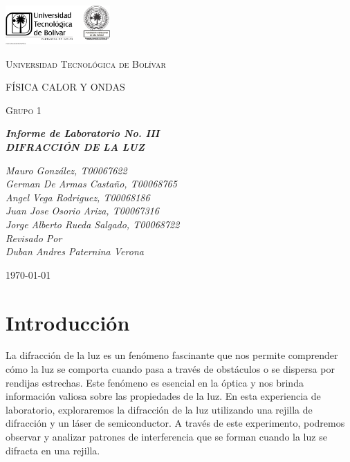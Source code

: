 \documentclass[twocolumn, 12pt]{article}
\begin{document}
\begin{titlepage}
      \centering
      \includegraphics[width=0.3\textwidth]{Images/logo_utb.png}\par\vspace{1cm}
      {\scshape\LARGE Universidad Tecnológica de Bolívar \par}
      \vspace{1cm}

      {\scshape\Large FÍSICA CALOR Y ONDAS \par}
      \vspace{.2cm}

      {\scshape\Large Grupo 1 \par}
      \vspace{1cm}
      \slshape {\Large \bfseries{}Informe de Laboratorio No. III\\}
      \slshape {\small \bfseries{}DIFRACCIÓN DE LA LUZ}
      \vspace{2cm}

      \slshape {\itshape{} Mauro González, T00067622 \\}
      \slshape {\itshape{} German De Armas Castaño, T00068765 \\}
      \slshape {\itshape{} Angel Vega Rodriguez, T00068186 \\}
      \slshape {\itshape{} Juan Jose Osorio Ariza, T00067316 \\}
      \slshape {\itshape{} Jorge Alberto Rueda Salgado, T00068722 \\}
      \vfill
      Revisado Por \\
      Duban Andres Paternina Verona\\
      {\large \today\par}
\end{titlepage}


\section{Introducción}

La difracción de la luz es un fenómeno fascinante que nos
permite comprender cómo la luz se comporta cuando pasa a
través de obstáculos o se dispersa por rendijas estrechas.
Este fenómeno es esencial en la óptica y nos brinda
información valiosa sobre las propiedades de la luz. En
esta experiencia de laboratorio, exploraremos la difracción
de la luz utilizando una rejilla de difracción y un láser
de semiconductor. A través de este experimento, podremos
observar y analizar patrones de interferencia que se forman
cuando la luz se difracta en una rejilla.
\end{document}
